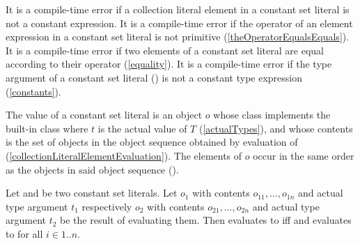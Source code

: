 \documentclass[makeidx]{article}
\begin{document}
{

\LMHash{}%
It is a compile-time error if
a collection literal element in a constant set literal
is not a constant expression.
It is a compile-time error if
the operator \lit{==} of an element expression in a constant set literal
is not primitive
(\ref{theOperatorEqualsEquals}).
It is a compile-time error if two elements of a constant set literal are equal
according to their \lit{==} operator
(\ref{equality}).
It is a compile-time error if the type argument of a constant set literal
()
is not a constant type expression
(\ref{constants}).


\LMHash{}%
The value of a constant set literal
is an object $o$ whose class implements the built-in class
where $t$ is the actual value of $T$
(\ref{actualTypes}),
and whose contents is the set of objects in
the object sequence  obtained by
evaluation of 
(\ref{collectionLiteralElementEvaluation}).
The elements of $o$ occur in the same order as
the objects in said object sequence
().

\LMHash{}%
Let 
and 
be two constant set literals.
Let $o_1$ with contents $o_{11}, \ldots, o_{1n}$ and actual type argument $t_1$
respectively
$o_2$ with contents $o_{21}, \ldots, o_{2n}$ and actual type argument $t_2$
be the result of evaluating them.
Then  evaluates to \TRUE{} if{}f
 and 
evaluates to \TRUE{} for all $i \in 1 .. n$.


}
\end{document}
